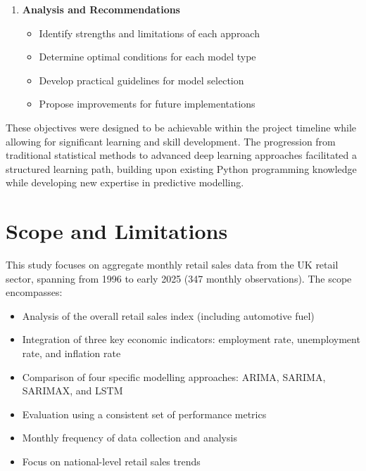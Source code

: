 \documentclass[12pt,a4paper]{report}
\begin{document}
\begin{enumerate}
    \item \textbf{Analysis and Recommendations}
    \begin{itemize}
        \item Identify strengths and limitations of each approach
        \item Determine optimal conditions for each model type
        \item Develop practical guidelines for model selection
        \item Propose improvements for future implementations
    \end{itemize}
\end{enumerate}

These objectives were designed to be achievable within the project timeline while allowing for significant learning and skill development. The progression from traditional statistical methods to advanced deep learning approaches facilitated a structured learning path, building upon existing Python programming knowledge while developing new expertise in predictive modelling.

\section{Scope and Limitations}

This study focuses on aggregate monthly retail sales data from the UK retail sector, spanning from 1996 to early 2025 (347 monthly observations). The scope encompasses:

\begin{itemize}
    \item Analysis of the overall retail sales index (including automotive fuel)
    \item Integration of three key economic indicators: employment rate, unemployment rate, and inflation rate
    \item Comparison of four specific modelling approaches: ARIMA, SARIMA, SARIMAX, and LSTM
    \item Evaluation using a consistent set of performance metrics
    \item Monthly frequency of data collection and analysis
    \item Focus on national-level retail sales trends
\end{itemize}
\end{document}
